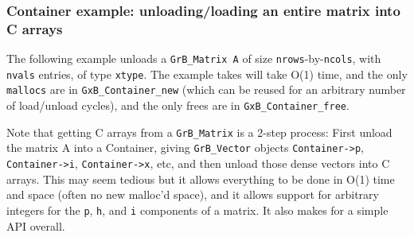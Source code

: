 \subsubsection{Container example: unloading/loading an entire matrix into C arrays}
\label{container_example}

The following example unloads a 
\verb'GrB_Matrix A' of size \verb'nrows'-by-\verb'ncols',
with \verb'nvals' entries, of type \verb'xtype'.  The example takes will take O(1) time,
and the only \verb'mallocs' are in \verb'GxB_Container_new' (which can be reused for
an arbitrary number of load/unload cycles), and the only frees are in
\verb'GxB_Container_free'.

Note that getting C arrays from a \verb'GrB_Matrix' is a 2-step process:
First unload the matrix A into a Container, giving \verb'GrB_Vector' objects
\verb'Container->p',
\verb'Container->i', \verb'Container->x', etc, and then unload those dense vectors into
C arrays.  This may seem tedious but it allows everything to be done in
O(1) time and space (often no new malloc'd space), and it allows support for
arbitrary integers for the \verb'p', \verb'h', and \verb'i' components of a matrix.
It also makes for a simple API overall.

